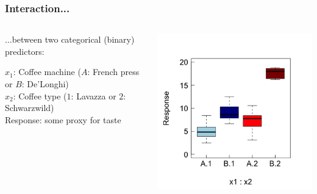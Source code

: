 \documentclass{beamer}
\begin{document}
\begin{frame}
  \frametitle{Interaction...}
  \begin{columns}
      \begin{column}{0.5\textwidth}
      ...between two categorical (binary) predictors:
      \vspace{0.5cm}
      
      $x_1$: Coffee machine ($A$: French press or $B$: De'Longhi)\\
      $x_2$: Coffee type ($1$: Lavazza or $2$: Schwarzwild)\\
      Response: some proxy for taste    
      \end{column}
      \begin{column}{0.5\textwidth}
      \includegraphics[width=\textwidth]{lectures/day_3_LM_refresh_II/figures/unnamed-chunk-36-1.png}
      \end{column}
  \end{columns}
\end{frame}
\end{document}
